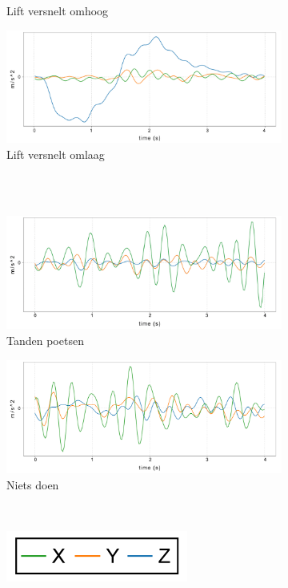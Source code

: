 \documentclass{article}
\begin{document}
\begin{figure}[h!]
\begin{subfigure}[b]{.49\linewidth}
    \caption{Lift versnelt omhoog}\label{fig:1g}
  \end{subfigure}
  \begin{subfigure}[b]{.49\linewidth}
    \centering
    \includegraphics[width=.80\textwidth]{figures/liftad}
    \caption{Lift versnelt omlaag}\label{fig:1h}
  \end{subfigure} \\~\\
  \begin{subfigure}[b]{.49\linewidth}
    \centering
    \includegraphics[width=.80\textwidth]{figures/tandenpoetsen}
    \caption{Tanden poetsen}\label{fig:1i}
  \end{subfigure}
  \begin{subfigure}[b]{.49\linewidth}
    \centering
    \includegraphics[width=.80\textwidth]{figures/nietsdoen}
    \caption{Niets doen}\label{fig:1j}
  \end{subfigure} \\
  \begin{subfigure}[b]{.49\linewidth}
    \centering
    \includegraphics[width=.25\textwidth]{figures/legend}
  \end{subfigure}
  
  \label{fig:8}
  
\end{figure}
\end{document}
